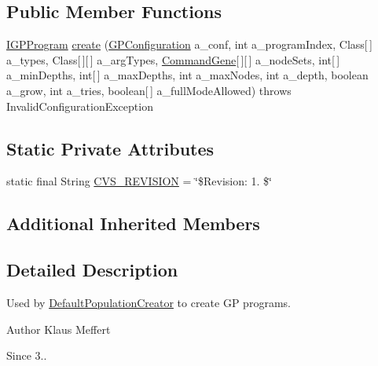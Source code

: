 \subsection*{Public Member Functions}
\begin{DoxyCompactItemize}
\item 
\hyperlink{interfaceorg_1_1jgap_1_1gp_1_1_i_g_p_program}{I\-G\-P\-Program} \hyperlink{classorg_1_1jgap_1_1gp_1_1impl_1_1_default_program_creator_ac68311af89a769d460678d795e61cb24}{create} (\hyperlink{classorg_1_1jgap_1_1gp_1_1impl_1_1_g_p_configuration}{G\-P\-Configuration} a\-\_\-conf, int a\-\_\-program\-Index, Class\mbox{[}$\,$\mbox{]} a\-\_\-types, Class\mbox{[}$\,$\mbox{]}\mbox{[}$\,$\mbox{]} a\-\_\-arg\-Types, \hyperlink{classorg_1_1jgap_1_1gp_1_1_command_gene}{Command\-Gene}\mbox{[}$\,$\mbox{]}\mbox{[}$\,$\mbox{]} a\-\_\-node\-Sets, int\mbox{[}$\,$\mbox{]} a\-\_\-min\-Depths, int\mbox{[}$\,$\mbox{]} a\-\_\-max\-Depths, int a\-\_\-max\-Nodes, int a\-\_\-depth, boolean a\-\_\-grow, int a\-\_\-tries, boolean\mbox{[}$\,$\mbox{]} a\-\_\-full\-Mode\-Allowed)  throws Invalid\-Configuration\-Exception 
\end{DoxyCompactItemize}
\subsection*{Static Private Attributes}
\begin{DoxyCompactItemize}
\item 
static final String \hyperlink{classorg_1_1jgap_1_1gp_1_1impl_1_1_default_program_creator_a2e7f40cdb18598054f301598cc037805}{C\-V\-S\-\_\-\-R\-E\-V\-I\-S\-I\-O\-N} = \char`\"{}\$Revision\-: 1. \$\char`\"{}
\end{DoxyCompactItemize}
\subsection*{Additional Inherited Members}


\subsection{Detailed Description}
Used by \hyperlink{classorg_1_1jgap_1_1gp_1_1impl_1_1_default_population_creator}{Default\-Population\-Creator} to create G\-P programs.

\begin{DoxyAuthor}{Author}
Klaus Meffert 
\end{DoxyAuthor}
\begin{DoxySince}{Since}
3.. 
\end{DoxySince}


